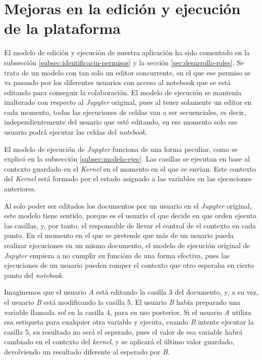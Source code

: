 \documentclass[11pt,spanish,listoffigures]{tfgetsinf}
\begin{document}

\section{Mejoras en la edición y ejecución de la plataforma}
\label{sec:mejoras-ejec}

El modelo de edición y ejecución de nuestra aplicación ha sido comentado en la subsección \ref{subsec:identificacin-permisos} y la sección \ref{sec:desarrollo-roles}. Se trata de un modelo con tan solo un editor concurrente, en el que ese permiso se va pasando por los diferentes usuarios con acceso al notebook que se está editando para conseguir la colaboración. El modelo de ejecución se mantenía inalterado con respecto al \textit{Jupyter} original, pues al tener solamente un editor en cada momento, todas las ejecuciones de celdas van a ser secuenciales, es decir, independientemente del usuario que esté editando, en ese momento solo ese usuario podrá ejecutar las celdas del \textit{notebook}.

El modelo de ejecución de \textit{Jupyter} funciona de una forma peculiar, como se explicó en la subsección \ref{subsec:modelo-ejec}. Las casillas se ejecutan en base al contexto guardado en el \textit{Kernel} en el momento en el que se envian. Este contexto del \textit{Kernel} está formado por el estado asignado a las variables en las ejecuciones anteriores. 

Al solo poder ser editados los documentos por un usuario en el \textit{Jupyter} original, este modelo tiene sentido, porque es el usuario el que decide en que orden ejecuta las casillas, y, por tanto, el  responsable de llevar el control de el contexto en cada punto. En el momento en el que se pretende que más de un usuario pueda realizar ejecuciones en un mismo documento, el modelo de ejecución original de \textit{Jupyter} empieza a no cumplir su funcióm de una forma efectiva, pues las ejecuciones de un usuario pueden romper el contexto que otro esperaba en cierto punto del \textit{notebook}.

Imaginemos que el usuario \textit{A} está editando la casilla 3 del documento, y, a su vez, el usuario \textit{B} está modificando la casilla 5. El usuario \textit{B} había preparado una variable llamada \textit{sol} en la casilla 4, para su uso posterior. Si el usuario \textit{A} utiliza esa estiqueta para cualquier otra variable y ejecuta, cuando \textit{B} intente ejecutar la casilla 5, su resultado no será el esperado, pues el valor de esa variable habrá cambiado en el contexto del \textit{kernel}, y se aplicará el último valor guardado, devolviendo un resultado diferente al esperado por \textit{B}.
\end{document}
